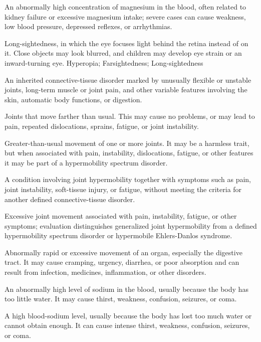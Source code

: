 An abnormally high concentration of magnesium in the blood, often related to kidney failure or excessive magnesium intake; severe cases can cause weakness, low blood pressure, depressed reflexes, or arrhythmias.

 Long-sightedness, in which the eye focuses light behind the retina instead of on it. Close objects may look blurred, and children may develop eye strain or an inward-turning eye.
\synonyms
Hyperopia; Farsightedness; Long-sightedness

 An inherited connective-tissue disorder marked by unusually flexible or unstable joints, long-term muscle or joint pain, and other variable features involving the skin, automatic body functions, or digestion.

 Joints that move farther than usual. This may cause no problems, or may lead to pain, repeated dislocations, sprains, fatigue, or joint instability.

 Greater-than-usual movement of one or more joints. It may be a harmless trait, but when associated with pain, instability, dislocations, fatigue, or other features it may be part of a hypermobility spectrum disorder.

 A condition involving joint hypermobility together with symptoms such as pain, joint instability, soft-tissue injury, or fatigue, without meeting the criteria for another defined connective-tissue disorder.

 Excessive joint movement associated with pain, instability, fatigue, or other symptoms; evaluation distinguishes generalized joint hypermobility from a defined hypermobility spectrum disorder or hypermobile Ehlers-Danlos syndrome.

 Abnormally rapid or excessive movement of an organ, especially the digestive tract. It may cause cramping, urgency, diarrhea, or poor absorption and can result from infection, medicines, inflammation, or other disorders.

 An abnormally high level of sodium in the blood, usually because the body has too little water. It may cause thirst, weakness, confusion, seizures, or coma.

 A high blood-sodium level, usually because the body has lost too much water or cannot obtain enough. It can cause intense thirst, weakness, confusion, seizures, or coma.

